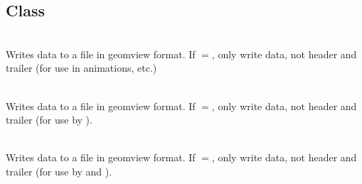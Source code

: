 \documentclass[11pt]{article}
\begin{document}
\subsection{ Class} \label{ss:geomview}

      \\ Writes  data to a file in geomview format.
     If $=$, only write data, not header and
     trailer (for use in animations, etc.)

      \\ Writes  data to a file in geomview format.
     If $=$, only write data, not header and
     trailer (for use by ).

      \\ Writes  data to a file in geomview
     format.  If $=$, only write data, not header
     and trailer (for use by  and
     ).

\end{document}
